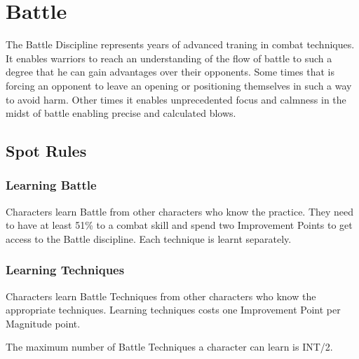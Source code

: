 \chapter{Battle}
\label{ch:battle}

The Battle Discipline represents years of advanced traning in combat techniques. It enables warriors to reach an understanding of the flow of battle to such a degree that he can gain advantages over their opponents. Some times that is forcing an opponent to leave an opening or positioning themselves in such a way to avoid harm. Other times it enables unprecedented focus and calmness in the midst of battle enabling precise and calculated blows.


\section{Spot Rules}

\subsection{Learning Battle}
Characters learn Battle from other characters who know the practice. They need to have at least 51\% to a combat skill and spend two Improvement Points to get access to the Battle discipline. Each technique is learnt separately.


\subsection{Learning Techniques}
Characters learn Battle Techniques from other characters who know the appropriate techniques. Learning techniques costs one Improvement Point per Magnitude point. 

The maximum number of Battle Techniques a character can learn is INT/2.


